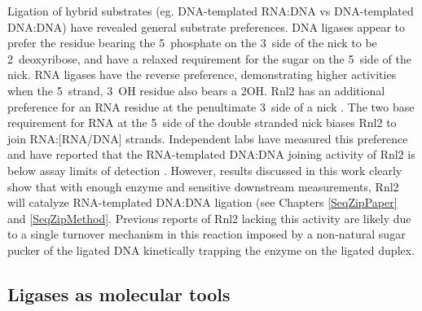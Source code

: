     Ligation of hybrid substrates (eg. DNA-templated RNA:DNA vs DNA-templated DNA:DNA) have revealed general substrate preferences. DNA ligases appear to prefer the residue bearing the 5\textprime~phosphate on the 3\textprime~side of the nick to be 2\textprime~deoxyribose, and have a relaxed requirement for the sugar on the 5\textprime~side of the nick. RNA ligases have the reverse preference, demonstrating higher activities when the 5\textprime~strand, 3\textprime~OH residue also bears a 2\textprime OH. Rnl2 has an additional preference for an RNA residue at the penultimate 3\textprime~side of a nick \citep{Ho2002b,Ho2004, Nandakumar2004a, Nandakumar2006}. The two base requirement for RNA at the 5\textprime~side of the double stranded nick biases Rnl2 to join RNA:[RNA/DNA] strands. Independent labs have measured this preference and have reported that the RNA-templated DNA:DNA joining activity of Rnl2 is below assay limits of detection \citep{Bullard2006}. However, results discussed in this work clearly show that with enough enzyme and sensitive downstream measurements, Rnl2 will catalyze RNA-templated DNA:DNA ligation (see Chapters \ref{SeqZipPaper} and \ref{SeqZipMethod}. Previous reports of Rnl2 lacking this activity are likely due to a single turnover mechanism in this reaction imposed by a non-natural sugar pucker of the ligated DNA kinetically trapping the enzyme on the ligated duplex.

  \subsection{Ligases as molecular tools}

